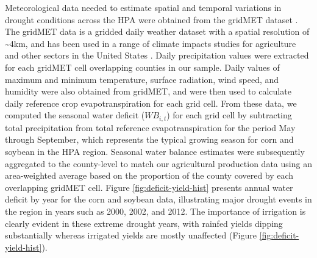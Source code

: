 \documentclass[
]{article}
\begin{document}
Meteorological data needed to estimate spatial and temporal variations in drought conditions across the HPA were obtained from the gridMET dataset \citep{Abatzoglou2013}. The gridMET data is a gridded daily weather dataset with a spatial resolution of \textasciitilde4km, and has been used in a range of climate impacts studies for agriculture and other sectors in the United States \citep{abatzoglou2016impact, pereira2015crop, crane2018machine, venkatappa2021impacts, zhu2019dissecting}. Daily precipitation values were extracted for each gridMET cell overlapping counties in our sample. Daily values of maximum and minimum temperature, surface radiation, wind speed, and humidity were also obtained from gridMET, and were then used to calculate daily reference crop evapotranspiration for each grid cell. From these data, we computed the seasonal water deficit (\(WB_{i,t}\)) for each grid cell by subtracting total precipitation from total reference evapotranspiration for the period May through September, which represents the typical growing season for corn and soybean in the HPA region. Seasonal water balance estimates were subsequently aggregated to the county-level to match our agricultural production data using an area-weighted average based on the proportion of the county covered by each overlapping gridMET cell. Figure \ref{fig:deficit-yield-hist} presents annual water deficit by year for the corn and soybean data, illustrating major drought events in the region in years such as 2000, 2002, and 2012. The importance of irrigation is clearly evident in these extreme drought years, with rainfed yields dipping substantially whereas irrigated yields are mostly unaffected (Figure \ref{fig:deficit-yield-hist}).
\end{document}
